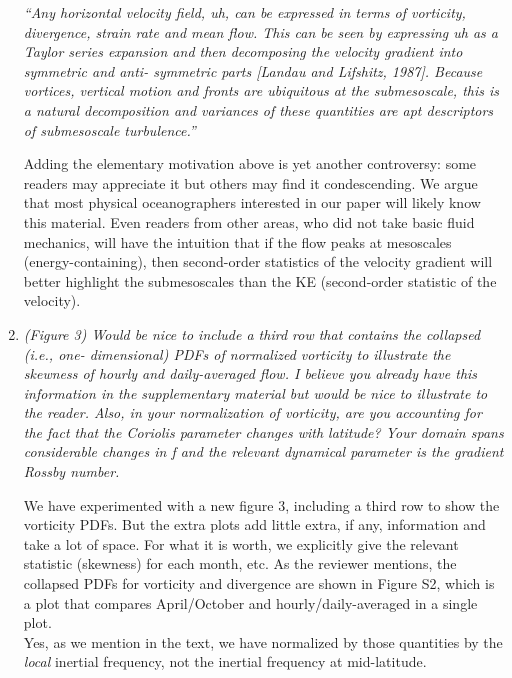 \documentclass[11pt]{article}
\newcommand{\bdp}{\begin{description}}
\newcommand{\edp}{\end{description}}
\begin{document}
\begin{enumerate}
      {\it ``Any horizontal velocity field, uh, can be expressed in terms of vorticity, divergence,
      strain rate and mean flow. This can be seen by expressing uh as a Taylor series
      expansion and then decomposing the velocity gradient into symmetric and anti-
      symmetric parts [Landau and Lifshitz, 1987]. Because vortices, vertical motion and
      fronts are ubiquitous at the submesoscale, this is a natural decomposition and
      variances of these quantities are apt descriptors of submesoscale turbulence.''}\\

      \bdp
        Adding the elementary motivation above is yet another controversy: some
        readers may appreciate it but others may find it condescending.
        We argue that most physical oceanographers interested in our paper will
        likely know this material. Even readers from other areas, who did not take
        basic fluid mechanics, will have the intuition that if the flow peaks
        at mesoscales (energy-containing), then second-order statistics of the
        velocity gradient will better highlight the submesoscales than the
        KE (second-order statistic of the velocity).
      \edp


\item {\it (Figure 3) Would be nice to include a third row that contains the collapsed (i.e., one-
      dimensional) PDFs of normalized vorticity to illustrate the skewness of hourly and
      daily-averaged flow. I believe you already have this information in the supplementary
      material but would be nice to illustrate to the reader. Also, in your normalization of
      vorticity, are you accounting for the fact that the Coriolis parameter changes with
      latitude? Your domain spans considerable changes in f and the relevant dynamical
      parameter is the gradient Rossby number.}

      \bdp
        We have experimented with a new figure 3, including a third row to show the
        vorticity PDFs. But the extra plots add little extra, if any, information
        and take a lot of space. For what it is worth, we explicitly give the relevant statistic
        (skewness) for each month, etc.  As the reviewer mentions, the collapsed
        PDFs for vorticity and divergence are shown in Figure S2, which is a plot
        that compares April/October and hourly/daily-averaged in a single plot.\\


        Yes, as we mention in the text, we have normalized by those
        quantities by the \textit{local} inertial frequency, not the inertial
        frequency at mid-latitude.
      \edp


\end{enumerate}
\end{document}
